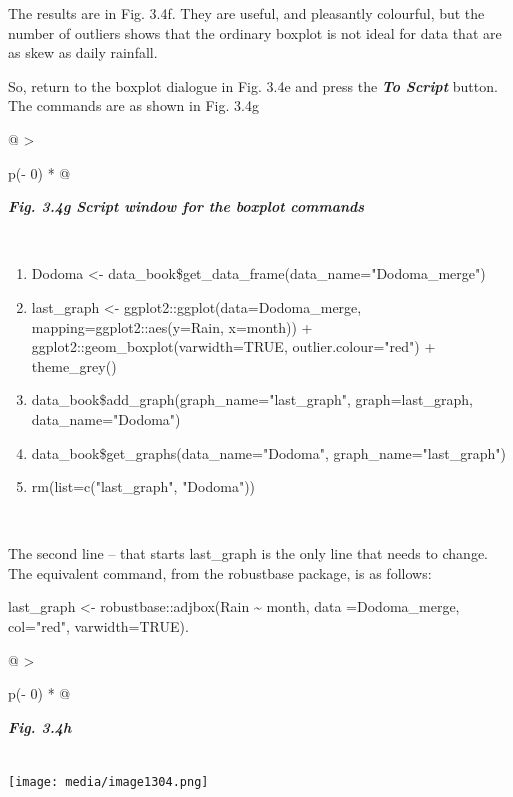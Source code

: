 \documentclass[
  letterpaper,
  DIV=11,
  numbers=noendperiod]{scrreprt}
\begin{document}
The results are in Fig. 3.4f. They are useful, and pleasantly colourful,
but the number of outliers shows that the ordinary boxplot is not ideal
for data that are as skew as daily rainfall.

So, return to the boxplot dialogue in Fig. 3.4e and press the
\textbf{\emph{To Script}} button. The commands are as shown in Fig. 3.4g

\begin{longtable}[]{@{}
  >{\raggedright\arraybackslash}p{(\columnwidth - 0\tabcolsep) * }@{}}
\toprule\noalign{}
\begin{minipage}[b]{\linewidth}\raggedright
\textbf{\emph{Fig. 3.4g Script window for the boxplot commands}}
\end{minipage} \\
\midrule\noalign{}
\endhead
\bottomrule\noalign{}
\endlastfoot
\begin{minipage}[t]{\linewidth}\raggedright
\begin{enumerate}
\def\labelenumi{\arabic{enumi}.}
\item
  Dodoma \textless-
  data\_book\$get\_data\_frame(data\_name="Dodoma\_merge")
\item
  last\_graph \textless- ggplot2::ggplot(data=Dodoma\_merge,
  mapping=ggplot2::aes(y=Rain, x=month)) +
  ggplot2::geom\_boxplot(varwidth=TRUE, outlier.colour="red") +
  theme\_grey()
\item
  data\_book\$add\_graph(graph\_name="last\_graph", graph=last\_graph,
  data\_name="Dodoma")
\item
  data\_book\$get\_graphs(data\_name="Dodoma",
  graph\_name="last\_graph")
\item
  rm(list=c("last\_graph", "Dodoma"))
\end{enumerate}
\end{minipage} \\
\end{longtable}

The second line -- that starts last\_graph is the only line that needs
to change. The equivalent command, from the robustbase package, is as
follows:

last\_graph \textless- robustbase::adjbox(Rain \textasciitilde{} month,
data =Dodoma\_merge, col="red", varwidth=TRUE).

\begin{longtable}[]{@{}
  >{\raggedright\arraybackslash}p{(\columnwidth - 0\tabcolsep) * }@{}}
\toprule\noalign{}
\begin{minipage}[b]{\linewidth}\raggedright
\textbf{\emph{Fig. 3.4h}}
\end{minipage} \\
\midrule\noalign{}
\endhead
\bottomrule\noalign{}
\endlastfoot
\texttt{[image: media/image1304.png]} \\
\end{longtable}
\end{document}
